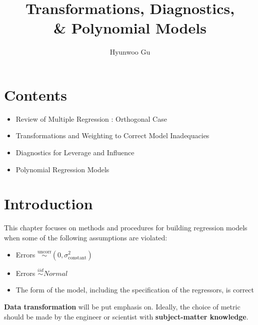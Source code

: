 \documentclass[12pt]{article}
\begin{document}
\title{\textbf{Transformations, Diagnostics, \\ \& Polynomial Models}}
\author{Hyunwoo Gu}
\date{}

\maketitle



\section*{Contents}

\begin{itemize}
	\item Review of Multiple Regression : Orthogonal Case
	\item Transformations and Weighting to Correct Model Inadequacies 
	\item Diagnostics for Leverage and Influence
	\item Polynomial Regression Models
\end{itemize}


\section{Introduction}

This chapter focuses on methods and procedures for building regression models when some of the following assumptions are violated:

\begin{itemize}
  \item Errors $\overset{\text{uncorr}}{\sim} (0, \sigma^2_{\text{constant}})$ 
  \item Errors $\overset{iid}{\sim} Normal$
  \item The form of the model, including the specification of the regressors, is correct
\end{itemize}

\textbf{Data transformation} will be put emphasis on. Ideally, the choice of metric should be made by the engineer or scientist with \textbf{subject-matter knowledge}.

\end{document}
